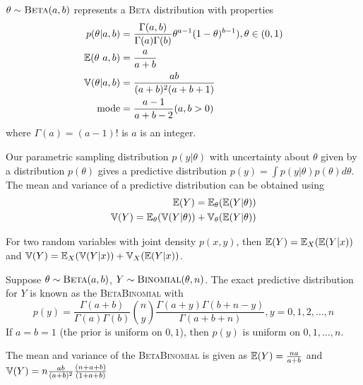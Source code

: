 \begin{defn}
  \label{sec:prob-bayes-theor-4}
  $\theta \sim \textsc{Beta}(a, b)$ represents a \textsc{Beta} distribution with
  properties
  \begin{align}
    p(\theta | a, b) &= \frac{\Gamma(a, b)}{\Gamma(a) \Gamma(b)} \theta^{a-1} (1 - \theta)^{b-1}), \theta \in (0, 1) \\
    \E{\theta \ a, b} &= \frac{a}{a+b} \\
    \Var{\theta | a, b} &= \frac{ab}{(a+b)^{2}(a+b+1)} \\
    \text{mode} &= \frac{a-1}{a+b - 2}  (a, b > 0) \\
  \end{align}
  where $\Gamma(a) = (a-1)!$ is $a$ is an integer.
\end{defn}

\begin{thm}
  \label{sec:prob-bayes-theor-5}
  Our parametric sampling distribution $p(y | \theta)$ with
  uncertainty about $\theta$ given by a distribution $p(\theta)$ gives
  a predictive distribution $p(y) = \int p(y| \theta) p(\theta)
  d\theta$.
  The mean and variance of a predictive distribution can be obtained
  using
  \begin{align}
    \label{eq:4}
    \E{Y} = \E_{\theta}(\E{Y | \theta}) \\
    \Var{Y} = \E_{\theta}(\Var{Y | \theta}) + \Var_{\theta}(\E{Y | \theta})
  \end{align}
\end{thm}

\begin{thm}
  \label{sec:prob-bayes-theor-6}
  For two random variables with joint density $p(x, y)$, then $\E{Y} =
  \E_{X}(\E{Y | x})$ and $\Var{Y} = \E_{X}(\Var{Y | x}) + \Var_{X}(\E{Y|x})$.
\end{thm}

\begin{defn}
  \label{sec:prob-bayes-theor-7}
  Suppose $\theta \sim \textsc{Beta}(a, b)$, $Y \sim \textsc{Binomial}(\theta, n)$.  The
  exact predictive distribution for $Y$ is known as the
  \textsc{BetaBinomial} with
  \begin{equation}
    \label{eq:5}
    p(y) = \frac{\Gamma(a+b)}{\Gamma(a) \Gamma(b)}  {n \choose y}
    \frac{\Gamma(a+y) \Gamma(b + n - y)}{\Gamma(a + b + n)}, y = 0,1,2,\dots,n
  \end{equation}
  If $a = b = 1$ (the prior is uniform on $0, 1$), then $p(y)$ is
  uniform on $0, 1, \dots, n$.

  The mean and variance of the \textsc{BetaBinomial} is given as $\E{Y} =
  \frac{na}{a+b}$ and $\Var{Y} = n \frac{ab}{(a+b)^{2}} \frac{(n+a+b)}{(1+a+b)}$
\end{defn}

